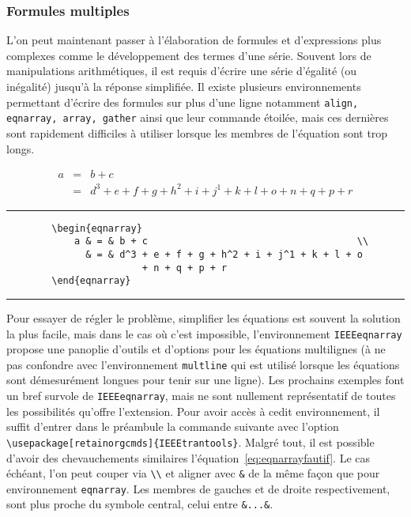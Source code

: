 \subsubsection*{Formules multiples}
L'on peut maintenant passer à l'élaboration de formules et d'expressions plus complexes comme le développement des termes d'une série. Souvent lors de manipulations arithmétiques, il est requis d'écrire une série d'égalité (ou inégalité) jusqu'à la réponse simplifiée. Il existe plusieurs environnements permettant d'écrire des formules sur plus d'une ligne notamment \verb|align, eqnarray, array, gather| ainsi que leur commande étoilée, mais ces dernières sont rapidement difficiles à utiliser lorsque les membres de l'équation sont trop longs.
%
\begin{table}[H]
	\centering
	\begin{eqnarray}
		a & = & b + c     \\
		  & = & d^3 + e + f + g + h^2 + i + j^1 + k + l + o
			      + n + q + p + r
	\label{eq:eqnarrayfautif}
	\end{eqnarray}
	\hrule
	\begin{verbatim}
		\begin{eqnarray}
			a & = & b + c                                     \\
			  & = & d^3 + e + f + g + h^2 + i + j^1 + k + l + o
					    + n + q + p + r
		\end{eqnarray}		
	\end{verbatim}
	\hrule
\end{table}
%
\break
\par Pour essayer de régler le problème, simplifier les équations est souvent la solution la plus facile, mais dans le cas où c'est impossible, l'environnement \verb|IEEEeqnarray| propose une panoplie d'outils et d'options pour les équations multilignes (à ne pas confondre avec l'environnement \verb|multline| qui est utilisé lorsque les équations sont démesurément longues pour tenir sur une ligne). Les prochains exemples font un bref survole de \verb|IEEEeqnarray|, mais ne sont nullement représentatif de toutes les possibilités qu'offre l'extension. Pour avoir accès à cedit environnement, il suffit d'entrer dans le préambule la commande suivante avec l'option \verb|\usepackage[retainorgcmds]{IEEEtrantools}|. Malgré tout, il est possible d'avoir des chevauchements similaires l'équation~\ref{eq:eqnarrayfautif}. Le cas échéant, l'on peut couper via \verb|\\| et aligner avec \verb|&| de la même façon que pour environnement \verb|eqnarray|. Les membres de gauches et de droite respectivement, sont plus proche du symbole central, celui entre \verb|&...&|.
